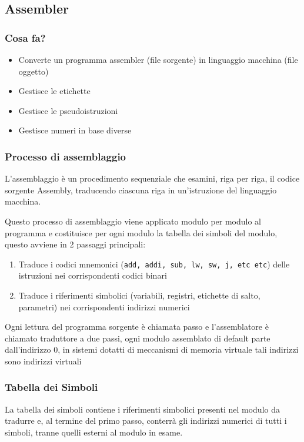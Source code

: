 \newpage
\subsection{Assembler}
\subsubsection{Cosa fa?}
\begin{itemize}
    \item Converte un programma assembler (file sorgente) in linguaggio macchina (file oggetto)
    \item Gestisce le etichette
    \item Gestisce le pseudoistruzioni
    \item Gestisce numeri in base diverse
\end{itemize}

\subsubsection{Processo di assemblaggio}
L'assemblaggio è un procedimento sequenziale che esamini, riga per riga, il codice sorgente Assembly, traducendo ciascuna riga in un'istruzione del linguaggio macchina. 

Questo processo di assemblaggio viene applicato modulo per modulo al programma e costituisce per ogni modulo la tabella dei simboli del modulo, questo avviene in 2 passaggi principali:

\begin{enumerate}
    \item Traduce i codici mnemonici (\texttt{add, addi, sub, lw, sw, j, etc etc}) delle istruzioni nei corrispondenti codici binari
    \item Traduce i riferimenti simbolici (variabili, registri, etichette di salto, parametri) nei corrispondenti indirizzi numerici
\end{enumerate}

Ogni lettura del programma sorgente è chiamata passo e l'assemblatore è chiamato traduttore a due passi, ogni modulo assemblato di default parte dall'indirizzo 0, in sistemi dotatti di meccanismi di memoria virtuale tali indirizzi sono indirizzi virtuali

\subsubsection{Tabella dei Simboli}
La tabella dei simboli contiene i riferimenti simbolici presenti nel modulo da tradurre e, al termine del primo passo, conterrà gli indirizzi numerici di tutti i simboli, tranne quelli esterni al modulo in esame.

